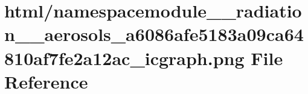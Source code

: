 \hypertarget{namespacemodule____radiation____aerosols__a6086afe5183a09ca64810af7fe2a12ac__icgraph_8png}{}\section{html/namespacemodule\+\_\+\+\_\+radiation\+\_\+\+\_\+aerosols\+\_\+a6086afe5183a09ca64810af7fe2a12ac\+\_\+icgraph.png File Reference}
\label{namespacemodule____radiation____aerosols__a6086afe5183a09ca64810af7fe2a12ac__icgraph_8png}
